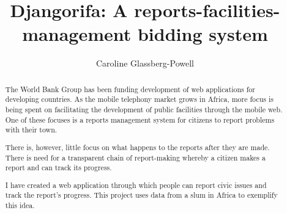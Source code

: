 \documentclass{report}
\title{Djangorifa: A reports-facilities-management bidding system}
\author{Caroline Glassberg-Powell}
\begin{document}
\maketitle

\begin{abstract}
The World Bank Group has been funding development of web applications for developing countries. As the mobile telephony market grows in Africa, more focus is being spent on facilitating the development of public facilities through the mobile web. One of these focuses is a reports management system for citizens to report problems with their town.

There is, however, little focus on what happens to the reports after they are made. There is need for a transparent chain of report-making whereby a citizen makes a report and can track its progress.

I have created a web application through which people can report civic issues and track the report's progress. This project uses data from a slum in Africa to exemplify this idea.
\end{abstract}

\tableofcontents







\printglossaries
\printbibliography
\end{document}
